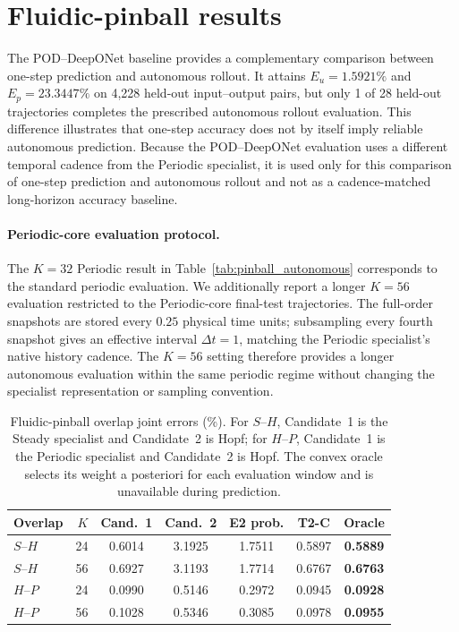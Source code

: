 \section{Fluidic-pinball results}
\label{app:pinball}

The POD--DeepONet baseline provides a complementary comparison between
one-step prediction and autonomous rollout. It attains $E_u=1.5921\%$ and $E_p=23.3447\%$ on 4,228 held-out input--output pairs, but only 1 of 28 held-out trajectories completes the prescribed autonomous rollout evaluation. This difference illustrates that one-step accuracy does not by itself imply reliable autonomous prediction. Because the POD--DeepONet evaluation uses a different temporal cadence from
the Periodic specialist, it is used only for this comparison of one-step prediction and autonomous rollout and not as a cadence-matched long-horizon accuracy baseline.

\paragraph{Periodic-core evaluation protocol.}
The $K=32$ Periodic result in Table~\ref{tab:pinball_autonomous} corresponds to the standard periodic evaluation. We additionally report a longer $K=56$ evaluation restricted to the Periodic-core final-test trajectories. The full-order snapshots are stored every $0.25$ physical time units; subsampling every fourth snapshot gives an effective interval $\Delta t=1$, matching the Periodic specialist's native history cadence. The $K=56$ setting therefore provides a longer autonomous evaluation within the same periodic regime without changing the specialist representation or
sampling convention.

\begin{table}[h]
\centering
\caption{
Fluidic-pinball overlap joint errors (\%). For $S$--$H$, Candidate~1 is the Steady specialist and Candidate~2 is Hopf; for $H$--$P$, Candidate~1 is the Periodic specialist and Candidate~2 is Hopf.
The convex oracle selects its weight a posteriori for each evaluation window and is unavailable during prediction.
}
\label{tab:pinball_overlap}
\small
\setlength{\tabcolsep}{3.5pt}
\begin{tabular}{lrccccc}
\toprule
Overlap & $K$ & Cand.~1 & Cand.~2 & E2 prob. & T2-C & Oracle \\
\midrule
$S$--$H$ & 24 & 0.6014 & 3.1925 & 1.7511 & 0.5897 & \textbf{0.5889} \\
$S$--$H$ & 56 & 0.6927 & 3.1193 & 1.7714 & 0.6767 & \textbf{0.6763} \\
$H$--$P$ & 24 & 0.0990 & 0.5146 & 0.2972 & 0.0945 & \textbf{0.0928} \\
$H$--$P$ & 56 & 0.1028 & 0.5346 & 0.3085 & 0.0978 & \textbf{0.0955} \\
\bottomrule
\end{tabular}
\end{table}

